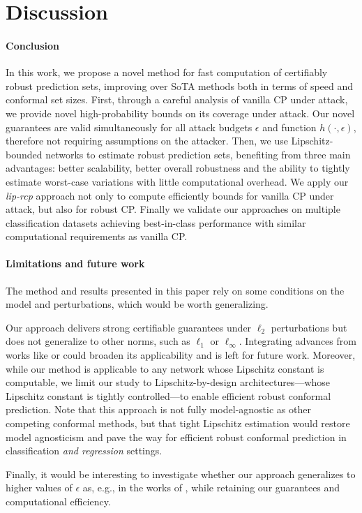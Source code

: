 \section{Discussion}

\paragraph{Conclusion}
In this work, we propose a novel method for fast computation of certifiably robust prediction sets, improving over SoTA methods both in terms of speed and conformal set sizes.
First, through a careful analysis of vanilla CP under attack, we provide novel high-probability bounds on its coverage under attack. 
Our novel guarantees are valid simultaneously for all attack budgets $\epsilon$ and function $h(\cdot, \epsilon)$, therefore not requiring assumptions on the attacker. 
Then, we use Lipschitz-bounded networks to estimate robust prediction sets, benefiting from three main advantages: better scalability, better overall robustness and the ability to tightly estimate worst-case variations with little computational overhead. We apply our \emph{lip-rcp} approach not only to compute efficiently bounds for vanilla CP under attack, but also for robust CP. Finally we validate our approaches on multiple classification datasets achieving best-in-class performance with similar computational requirements as vanilla CP.

\paragraph{Limitations and future work}
The method and results presented in this paper rely on some conditions on the model and perturbations, which would be worth generalizing.

Our approach delivers strong certifiable guarantees under $\ell_2$ perturbations but does not generalize to other norms, such as $\ell_1$ or $\ell_\infty$. Integrating advances from works like \citet{l_1lipschitz} or \citet{zhang2021certifyinglinfinityrobustnessusing} could broaden its applicability and is left for future work.
Moreover, while our method is applicable to any network whose Lipschitz constant is computable, we limit our study to Lipschitz-by-design architectures---whose Lipschitz constant is tightly controlled---to enable efficient robust conformal prediction. Note that this approach is not fully model-agnostic as other competing conformal methods, but that
tight Lipschitz estimation would restore model agnosticism and pave the way for efficient robust conformal prediction in classification \textit{and regression} settings.

Finally, it would be interesting to investigate whether our approach generalizes to higher values of $\epsilon$ as, e.g., in the works of \citet{rscp, cas}, while retaining our guarantees and computational efficiency.